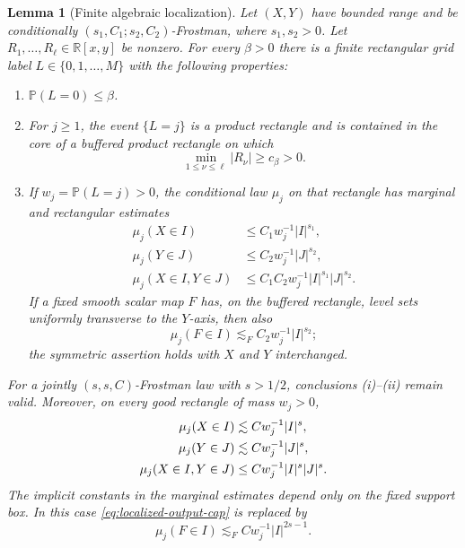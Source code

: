 \documentclass[11pt]{article}
\newtheorem{lemma}[theorem]{Lemma}
\begin{document}
\begin{lemma}[Finite algebraic localization]
\label{lem:algebraic-localization}
Let \((X,Y)\) have bounded range and be conditionally
\((s_1,C_1;s_2,C_2)\)-Frostman, where \(s_1,s_2>0\).  Let
\(R_1,\ldots,R_\ell\in\mathbb R[x,y]\) be nonzero.  For every
\(\beta>0\) there is a finite rectangular grid label
\(L\in\{0,1,\ldots,M\}\) with the following properties:
\begin{enumerate}[label=\textup{(\roman*)}]
\item \(\mathbb P(L=0)\le\beta\).
\item For \(j\ge1\), the event \(\{L=j\}\) is a product rectangle
and is contained in the core of a buffered product rectangle on
which
\begin{equation}
 \min_{1\le\nu\le\ell}|R_\nu|\ge c_\beta>0.
 \label{eq:localization-lower-bound}
\end{equation}
\item If \(w_j=\mathbb P(L=j)>0\), the conditional law \(\mu_j\) on that
rectangle has marginal and rectangular estimates
\begin{align}
 \mu_j(X\in I)&\le C_1w_j^{-1}|I|^{s_1},\\
 \mu_j(Y\in J)&\le C_2w_j^{-1}|J|^{s_2},\\
 \mu_j(X\in I,Y\in J)
 &\le C_1C_2w_j^{-1}|I|^{s_1}|J|^{s_2}.
 \label{eq:localized-Frostman}
\end{align}
If a fixed smooth scalar map \(F\) has, on the buffered rectangle,
level sets uniformly transverse to the \(Y\)-axis, then also
\begin{equation}
 \mu_j(F\in I)\lesssim_F C_2w_j^{-1}|I|^{s_2};
 \label{eq:localized-output-cap}
\end{equation}
the symmetric assertion holds with \(X\) and \(Y\) interchanged.
\end{enumerate}
For a jointly \((s,s,C)\)-Frostman law with \(s>1/2\), conclusions
\textup{(i)}--\textup{(ii)} remain valid.  Moreover, on every good
rectangle of mass \(w_j>0\),
\begin{align}
 \mu_j(X\in I)&\lesssim Cw_j^{-1}|I|^s,\notag\\
 \mu_j(Y\in J)&\lesssim Cw_j^{-1}|J|^s,\notag\\
 \mu_j(X\in I,Y\in J)&\le Cw_j^{-1}|I|^s|J|^s.
 \label{eq:localized-Frostman-joint}
\end{align}
The implicit constants in the marginal estimates depend only on the
fixed support box.  In this case
\eqref{eq:localized-output-cap} is replaced by
\begin{equation}
 \mu_j(F\in I)\lesssim_F Cw_j^{-1}|I|^{2s-1}.
 \label{eq:localized-output-cap-joint}
\end{equation}
\end{lemma}
\end{document}
